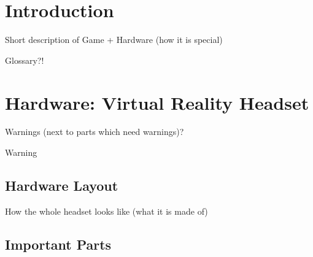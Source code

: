 \newcommand{\customDir}{../../}




\setCustomSignature{\footnotesize{\customAuthor}}	%
\setCustomTitleAuthor{\customAuthor}	%




%



\maketitle
\newpage
\tableofcontents
\newpage

\chapter{Introduction}

Short description of Game + Hardware (how it is special)

Glossary?!

\chapter{Hardware: Virtual Reality Headset}

Warnings (next to parts which need warnings)?

Warning 

\section{Hardware Layout}

How the whole headset looks like (what it is made of)

\section{Important Parts}

